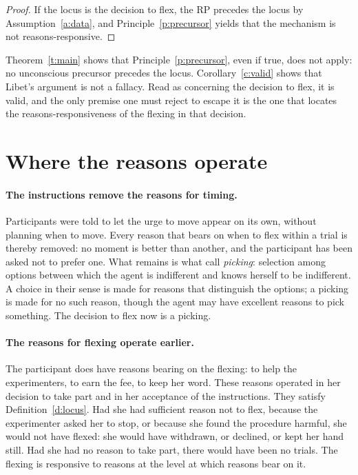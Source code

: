 \documentclass{situationist-preprint}
\begin{document}
\begin{proof}
If the locus is the decision to flex, the RP precedes the locus by Assumption~\ref{a:data}, and Principle~\ref{p:precursor} yields that the mechanism is not reasons-responsive.
\end{proof}

Theorem~\ref{t:main} shows that Principle~\ref{p:precursor}, even if true, does not apply: no unconscious precursor precedes the locus. Corollary~\ref{c:valid} shows that Libet's argument is not a fallacy. Read as concerning the decision to flex, it is valid, and the only premise one must reject to escape it is the one that locates the reasons-responsiveness of the flexing in that decision.

\section{Where the reasons operate}\label{s:locus}

\paragraph{The instructions remove the reasons for timing.} Participants were told to let the urge to move appear on its own, without planning when to move. Every reason that bears on when to flex within a trial is thereby removed: no moment is better than another, and the participant has been asked not to prefer one. What remains is what \citet{UllmannMargalitMorgenbesser1977} call \emph{picking}: selection among options between which the agent is indifferent and knows herself to be indifferent. A choice in their sense is made for reasons that distinguish the options; a picking is made for no such reason, though the agent may have excellent reasons to pick something. The decision to flex now is a picking.

\paragraph{The reasons for flexing operate earlier.} The participant does have reasons bearing on the flexing: to help the experimenters, to earn the fee, to keep her word. These reasons operated in her decision to take part and in her acceptance of the instructions. They satisfy Definition~\ref{d:locus}. Had she had sufficient reason not to flex, because the experimenter asked her to stop, or because she found the procedure harmful, she would not have flexed: she would have withdrawn, or declined, or kept her hand still. Had she had no reason to take part, there would have been no trials. The flexing is responsive to reasons at the level at which reasons bear on it.
\end{document}
